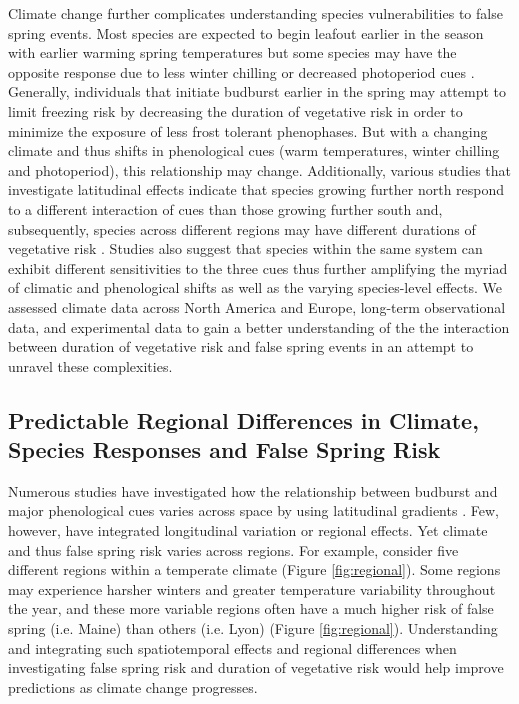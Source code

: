 \documentclass{article}\usepackage[]{graphicx}\usepackage[]{color}
\begin{document}
Climate change further complicates understanding species vulnerabilities to false spring events. Most species are expected to begin leafout earlier in the season with earlier warming spring temperatures but some species may have the opposite response due to less winter chilling or decreased photoperiod cues \citep{Cleland2006, Yu2010, Xin2016}. Generally, individuals that initiate budburst earlier in the spring may attempt to limit freezing risk by decreasing the duration of vegetative risk in order to minimize the exposure of less frost tolerant phenophases. But with a changing climate and thus shifts in phenological cues (warm temperatures, winter chilling and photoperiod), this relationship may change. Additionally, various studies that investigate latitudinal effects indicate that species growing further north respond to a different interaction of cues than those growing further south and, subsequently, species across different regions may have different durations of vegetative risk \citep {Partanen2004, Viheraaarnio2006, Caffarra2011}. Studies also suggest that species within the same system can exhibit different sensitivities to the three cues \citep{Basler2012, Laube2013} thus further amplifying the myriad of climatic and phenological shifts as well as the varying species-level effects.  We assessed climate data across North America and Europe, long-term observational data, and experimental data to gain a better understanding of the the interaction between duration of vegetative risk and false spring events in an attempt to unravel these complexities.

\subsection {Predictable Regional Differences in Climate, Species Responses and False Spring Risk}
Numerous studies have investigated how the relationship between budburst and major phenological cues varies across space by using latitudinal gradients \citep{Partanen2004, Viheraaarnio2006, Caffarra2011, Zohner2016, Gauzere2017}. Few, however, have integrated longitudinal variation or regional effects. Yet climate and thus false spring risk varies across regions. For example, consider five different regions within a temperate climate (Figure \ref{fig:regional}). Some regions may experience harsher winters and greater temperature variability throughout the year, and these more variable regions often have a much higher risk of false spring (i.e. Maine) than others (i.e. Lyon) (Figure \ref{fig:regional}). Understanding and integrating such spatiotemporal effects and regional differences when investigating false spring risk and duration of vegetative risk would help improve predictions as climate change progresses.
\end{document}
